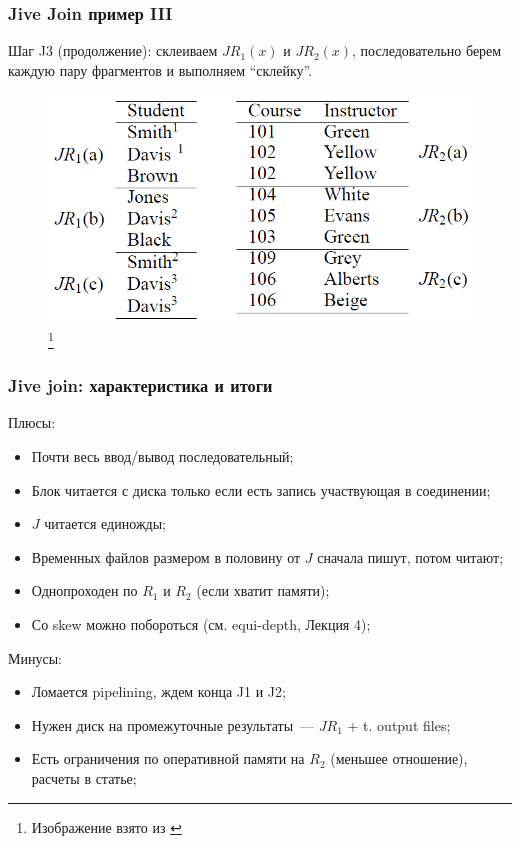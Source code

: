 \documentclass{beamer}
\begin{document}
\begin{frame}
\frametitle{Jive Join пример III}

Шаг J3 (продолжение): склеиваем $JR_1(x)$ и $JR_2(x)$, последовательно берем каждую пару фрагментов и выполняем ``склейку''.

\begin{figure}[htb]
\includegraphics[width=\textwidth,height=0.65\textheight,keepaspectratio]{jive-3.png} 
\footnote{\tiny{Изображение взято из \cite{Li1999}}}
\end{figure}

\end{frame}


\begin{frame}
\frametitle{Jive join: характеристика и итоги}

Плюсы:
\begin{itemize}
  \item Почти весь ввод/вывод последовательный;
  \item Блок читается с диска только если есть запись участвующая в соединении;
  \item $J$ читается единожды;
  \item Временных файлов размером в половину от $J$ сначала пишут, потом читают;
  \item Однопроходен по $R_1$ и $R_2$ (если хватит памяти);
  \item Со skew можно побороться (см. equi-depth, Лекция 4);
\end{itemize}

Минусы:
\begin{itemize}
  \item Ломается pipelining, ждем конца J1 и J2;
  \item Нужен диск на промежуточные результаты~--- $JR_1$ + t. output files; 
  \item Есть ограничения по оперативной памяти на $R_2$ (меньшее отношение), расчеты в статье;
\end{itemize}

\end{frame}
\end{document}
